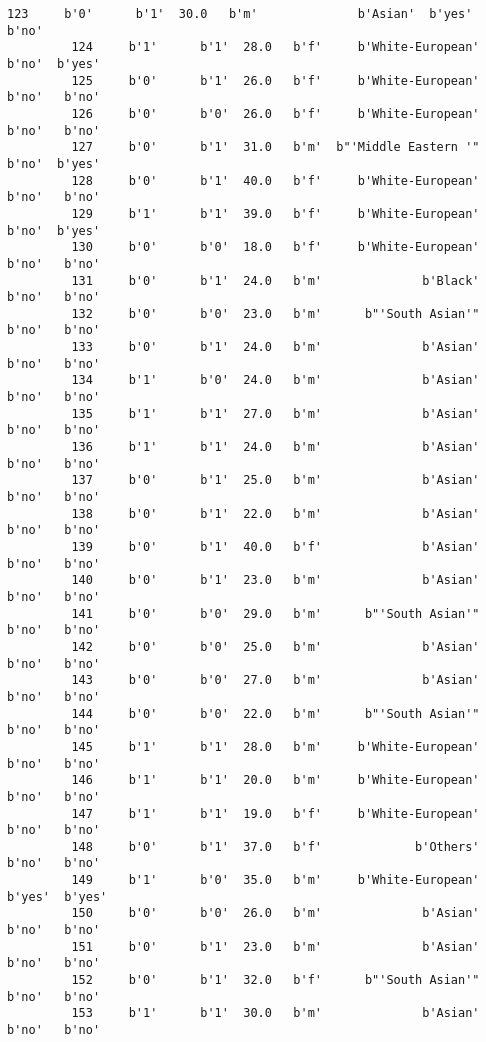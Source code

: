 \documentclass[11pt]{article}
\begin{document}
\begin{Verbatim}[commandchars=\\\{\}]
         123     b'0'      b'1'  30.0   b'm'              b'Asian'  b'yes'   b'no'   
         124     b'1'      b'1'  28.0   b'f'     b'White-European'   b'no'  b'yes'   
         125     b'0'      b'1'  26.0   b'f'     b'White-European'   b'no'   b'no'   
         126     b'0'      b'0'  26.0   b'f'     b'White-European'   b'no'   b'no'   
         127     b'0'      b'1'  31.0   b'm'  b"'Middle Eastern '"   b'no'  b'yes'   
         128     b'0'      b'1'  40.0   b'f'     b'White-European'   b'no'   b'no'   
         129     b'1'      b'1'  39.0   b'f'     b'White-European'   b'no'  b'yes'   
         130     b'0'      b'0'  18.0   b'f'     b'White-European'   b'no'   b'no'   
         131     b'0'      b'1'  24.0   b'm'              b'Black'   b'no'   b'no'   
         132     b'0'      b'0'  23.0   b'm'      b"'South Asian'"   b'no'   b'no'   
         133     b'0'      b'1'  24.0   b'm'              b'Asian'   b'no'   b'no'   
         134     b'1'      b'0'  24.0   b'm'              b'Asian'   b'no'   b'no'   
         135     b'1'      b'1'  27.0   b'm'              b'Asian'   b'no'   b'no'   
         136     b'1'      b'1'  24.0   b'm'              b'Asian'   b'no'   b'no'   
         137     b'0'      b'1'  25.0   b'm'              b'Asian'   b'no'   b'no'   
         138     b'0'      b'1'  22.0   b'm'              b'Asian'   b'no'   b'no'   
         139     b'0'      b'1'  40.0   b'f'              b'Asian'   b'no'   b'no'   
         140     b'0'      b'1'  23.0   b'm'              b'Asian'   b'no'   b'no'   
         141     b'0'      b'0'  29.0   b'm'      b"'South Asian'"   b'no'   b'no'   
         142     b'0'      b'0'  25.0   b'm'              b'Asian'   b'no'   b'no'   
         143     b'0'      b'0'  27.0   b'm'              b'Asian'   b'no'   b'no'   
         144     b'0'      b'0'  22.0   b'm'      b"'South Asian'"   b'no'   b'no'   
         145     b'1'      b'1'  28.0   b'm'     b'White-European'   b'no'   b'no'   
         146     b'1'      b'1'  20.0   b'm'     b'White-European'   b'no'   b'no'   
         147     b'1'      b'1'  19.0   b'f'     b'White-European'   b'no'   b'no'   
         148     b'0'      b'1'  37.0   b'f'             b'Others'   b'no'   b'no'   
         149     b'1'      b'0'  35.0   b'm'     b'White-European'  b'yes'  b'yes'   
         150     b'0'      b'0'  26.0   b'm'              b'Asian'   b'no'   b'no'   
         151     b'0'      b'1'  23.0   b'm'              b'Asian'   b'no'   b'no'   
         152     b'0'      b'1'  32.0   b'f'      b"'South Asian'"   b'no'   b'no'   
         153     b'1'      b'1'  30.0   b'm'              b'Asian'   b'no'   b'no'   

\end{Verbatim}
\end{document}
